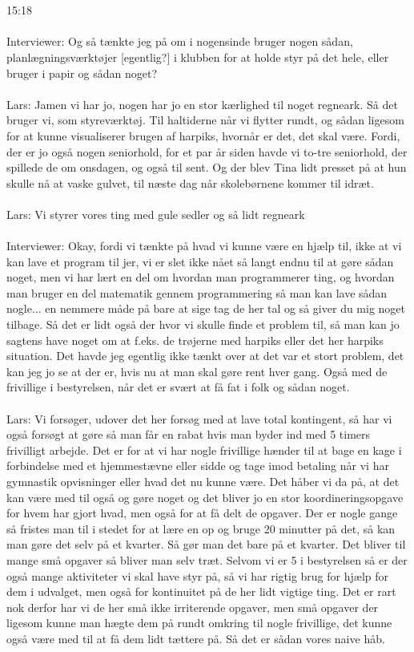 \\\\
15:18
\\\\
Interviewer: Og så tænkte jeg på om i nogensinde bruger nogen sådan, planlægningsværktøjer [egentlig?] i klubben for at holde styr på det hele, eller bruger i papir og sådan noget?
\\\\
Lars: Jamen vi har jo, nogen har jo en stor kærlighed til noget regneark. Så det bruger vi, som styreværktøj. Til haltiderne når vi flytter rundt, og sådan ligesom for at kunne visualiserer brugen af harpiks, hvornår er det, det skal være. Fordi, der er jo også nogen seniorhold, for et par år siden havde vi to-tre seniorhold, der spillede de om onsdagen, og også til sent. Og der blev Tina lidt presset på at hun skulle nå at vaske gulvet, til næste dag når skolebørnene kommer til idræt.
\\\\
Lars: Vi styrer vores ting med gule sedler og så lidt regneark
\\\\
Interviewer: Okay, fordi vi tænkte på hvad vi kunne være en hjælp til, ikke at vi kan lave et program til jer, vi er slet ikke nået så langt endnu til at gøre sådan noget, men vi har lært en del om hvordan man programmerer ting, og hvordan man bruger en del matematik gennem programmering så man kan lave sådan nogle... en nemmere måde på bare at sige tag de her tal og så giver du mig noget tilbage. Så det er lidt også der hvor vi skulle finde et problem til, så man kan jo sagtens have noget om at f.eks. de trøjerne med harpiks eller det her harpiks situation. Det havde jeg egentlig ikke tænkt over at det var et stort problem, det kan jeg jo se at der er, hvis nu at man skal gøre rent hver gang. Også med de frivillige i bestyrelsen, når det er svært at få fat i folk og sådan noget.
\\\\
Lars: Vi forsøger, udover det her forsøg med at lave total kontingent, så har vi også forsøgt at gøre så man får en rabat hvis man byder ind med 5 timers frivilligt arbejde. Det er for at vi har nogle frivillige hænder til at bage en kage i forbindelse med et hjemmestævne eller sidde og tage imod betaling når vi har gymnastik opvisninger eller hvad det nu kunne være. Det håber vi da på, at det kan være med til også og gøre noget og det bliver jo en stor koordineringsopgave for hvem har gjort hvad, men også for at få delt de opgaver. Der er nogle gange så fristes man til i stedet for at lære en op og bruge 20 minutter på det, så kan man gøre det selv på et kvarter. Så gør man det bare på et kvarter. Det bliver til mange små opgaver så bliver man selv træt. Selvom vi er 5 i bestyrelsen så er der også mange aktiviteter vi skal have styr på, så vi har rigtig brug for hjælp for dem i udvalget, men også for kontinuitet på de her lidt vigtige ting. Det er rart nok derfor har vi de her små ikke irriterende opgaver, men små opgaver der ligesom kunne man hægte dem på rundt omkring til nogle frivillige, det kunne også være med til at få dem lidt tættere på. Så det er sådan vores naive håb.
